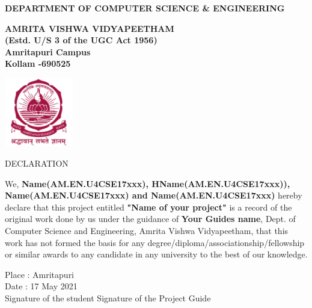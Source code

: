\documentclass[oneside,12pt]{Classes/CUEDthesisPSnPDF}
\begin{document}
\begin{center}

   {\normalsize {\bfseries{DEPARTMENT OF COMPUTER SCIENCE \& ENGINEERING\\[1ex]}}}


    {\normalsize {\bfseries{AMRITA VISHWA VIDYAPEETHAM\\ (Estd. U/S 3 of the UGC Act 1956)\\ [1ex]Amritapuri  Campus \\[1ex] Kollam -690525\\[1ex]}}}

    \includegraphics[width=30mm]{UNIVEMBLEM.jpg} 


    \rmfamily\bfseries\upshape\Large

				DECLARATION \\[2ex]


   \end{center}

	\vspace{1pt}

We, \textbf{Name(AM.EN.U4CSE17xxx), HName(AM.EN.U4CSE17xxx)), Name(AM.EN.U4CSE17xxx) and Name(AM.EN.U4CSE17xxx)} hereby declare that this project entitled \textbf{"Name of your project"} is a record of the original work done by us under the guidance of \textbf{Your Guides name}, Dept. of Computer Science and Engineering, Amrita Vishwa Vidyapeetham, that this work has not formed the basis for any degree/diploma/associationship/fellowship or similar awards to any candidate in any university to the best of our knowledge.\\

\vspace{60pt}

\begin{flushleft}

Place	:	Amritapuri\\[1ex]

Date	:	17 May 2021\\[15ex]

Signature of the student \hspace{90pt}	Signature of the Project Guide\\

\end{flushleft}

\setcounter{secnumdepth}{3}

\setcounter{tocdepth}{3}

\frontmatter %



\end{document}
